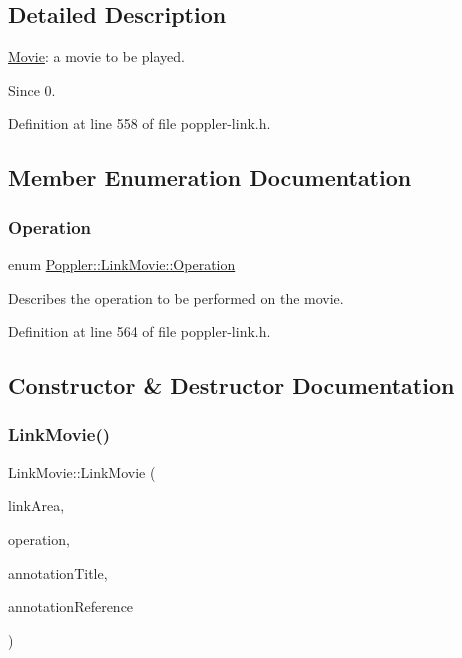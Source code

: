 \subsection{Detailed Description}
\hyperlink{class_movie}{Movie}\+: a movie to be played.

\begin{DoxySince}{Since}
0. 
\end{DoxySince}


Definition at line 558 of file poppler-\/link.\+h.



\subsection{Member Enumeration Documentation}
\mbox{\label{class_poppler_1_1_link_movie_a66b83ca2658b31b448e4b4696cb452ba}} 
\subsubsection{\texorpdfstring{Operation}{Operation}}
{\footnotesize\ttfamily enum \hyperlink{class_poppler_1_1_link_movie_a66b83ca2658b31b448e4b4696cb452ba}{Poppler\+::\+Link\+Movie\+::\+Operation}}

Describes the operation to be performed on the movie. 

Definition at line 564 of file poppler-\/link.\+h.



\subsection{Constructor \& Destructor Documentation}
\mbox{\label{class_poppler_1_1_link_movie_a915e1ce81056878282c79f5068ddc562}} 
\subsubsection{\texorpdfstring{Link\+Movie()}{LinkMovie()}}
{\footnotesize\ttfamily Link\+Movie\+::\+Link\+Movie (\begin{DoxyParamCaption}\item[{const Q\+RectF \&}]{link\+Area,  }\item[{\hyperlink{class_poppler_1_1_link_movie_a66b83ca2658b31b448e4b4696cb452ba}{Operation}}]{operation,  }\item[{const Q\+String \&}]{annotation\+Title,  }\item[{const \hyperlink{struct_ref}{Ref} \&}]{annotation\+Reference }\end{DoxyParamCaption})}

